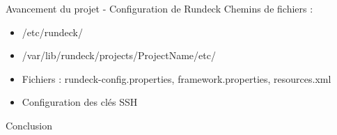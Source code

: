 \documentclass{beamer}
\begin{document}
\begin{frame}{Avancement du projet - Configuration de Rundeck}
    Chemins de fichiers :
    \begin{itemize}
        \item /etc/rundeck/
        \item /var/lib/rundeck/projects/ProjectName/etc/
        \item Fichiers : rundeck-config.properties, framework.properties, resources.xml
        \item Configuration des clés SSH
    \end{itemize}
\end{frame}

\begin{frame}{Conclusion}
    
\end{frame}
\end{document}
